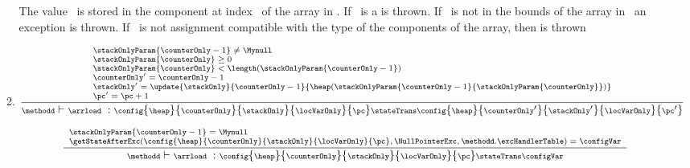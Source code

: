 \begin{itemize}
\begin{enumerate}
	The value \stackOnlyParam{\counterOnly} \ is stored in the component at index  \  of the array  in  .
	If  \ is \Mynull a \NullPointerExc is thrown. If   \  is not in the bounds of the array 
	in   \ an \ArrIndexOutOfBoundExc exception is thrown. If \stackOnlyParam{\counterOnly} \ is not assignment 
	compatible with the type of the components of the array, then \ArrStoreExc  is thrown 

					 						 


	\item \arrload       
	      
	     $${\scriptsize \frac{ \begin{array}{l}  \stackOnlyParam{\counterOnly - 1} \neq \Mynull  \ \\
					 \stackOnlyParam{\counterOnly} \geq 0   \\
					 \stackOnlyParam{\counterOnly} < \length (  \stackOnlyParam{\counterOnly - 1}  )  \\
			                     \counterOnly' = \counterOnly - 1\\
					     \stackOnly' = \update{\stackOnly}{\counterOnly - 1} {  \heap(\stackOnlyParam{ \counterOnly -1 }{\stackOnlyParam{ \counterOnly} } ) } \\
					     \pc'  =  \pc + 1
			 \end{array}}
			  {\methodd \vdash  \arrload \ :       \config{\heap}{\counterOnly}{\stackOnly}{\locVarOnly}{\pc} 
						 \stateTrans  
						 \config{\heap}{\counterOnly'}{\stackOnly'}{\locVarOnly}{\pc'}} } $$
						 

	  $${\scriptsize \frac{ \begin{array}{l}
	                      \stackOnlyParam{\counterOnly - 1} = \Mynull   \\
			      \getStateAfterExc( \config{\heap}{\counterOnly}{\stackOnly}{\locVarOnly}{\pc} , \NullPointerExc,\methodd.\excHandlerTable ) =  \configVar  \\  
		 \end{array}}
		 {\methodd \vdash  \arrload \ :  \config{\heap}{\counterOnly}{\stackOnly}{\locVarOnly}{\pc} 
			                         \stateTrans  
						 \configVar } } $$


\end{enumerate}
\end{itemize}
